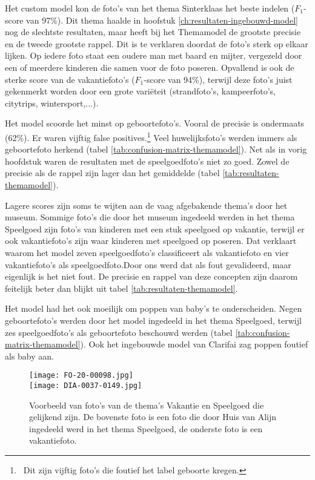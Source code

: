 Het custom model kon de foto's van het thema Sinterklaas het beste indelen ($F_1$-score van 97\%). Dit thema haalde in hoofstuk \ref{ch:resultaten-ingebouwd-model} nog de slechtste resultaten, maar heeft bij het Themamodel de grootste precisie en de tweede grootste rappel. Dit is te verklaren doordat de foto’s sterk op elkaar lijken. Op iedere foto staat een oudere man met baard en mijter, vergezeld door een of meerdere kinderen die samen voor de foto poseren. Opvallend is ook de sterke score van de vakantiefoto’s ($F_1$-score van 94\%), terwijl deze foto’s juist gekenmerkt worden door een grote variëteit (strandfoto’s, kampeerfoto’s, citytrips, wintersport,...).

Het model scoorde het minst op geboortefoto’s. Vooral de precisie is ondermaats (62\%). Er waren vijftig false positives.\footnote{~Dit zijn vijftig foto's die foutief het label geboorte kregen.} Veel huwelijksfoto’s werden immers als geboortefoto herkend (tabel \ref{tab:confusion-matrix-themamodel}). Net als in vorig hoofdstuk waren de resultaten met de speelgoedfoto’s niet zo goed. Zowel de precisie als de rappel zijn lager dan het gemiddelde (tabel \ref{tab:resultaten-themamodel}).

Lagere scores zijn soms te wijten aan de vaag afgebakende thema’s door het museum. Sommige foto’s die door het museum ingedeeld werden in het thema Speelgoed zijn foto’s van kinderen met een stuk speelgoed op vakantie, terwijl er ook vakantiefoto’s zijn waar kinderen met speelgoed op poseren. Dat verklaart waarom het model zeven speelgoedfoto’s classificeert als vakantiefoto en vier vakantiefoto’s als speelgoedfoto.Door ons werd dat als fout gevalideerd, maar eigenlijk is het niet fout. De precisie en rappel van deze concepten zijn daarom feitelijk beter dan blijkt uit tabel \ref{tab:resultaten-themamodel}.

Het model had het ook moeilijk om poppen van baby’s te onderscheiden. Negen geboortefoto’s werden door het model ingedeeld in het thema Speelgoed, terwijl zes speelgoedfoto’s als geboortefoto beschouwd werden (tabel \ref{tab:confusion-matrix-themamodel}). Ook het ingebouwde model van Clarifai zag poppen foutief als baby aan.

\begin{figure}
	\centering
	\texttt{[image: FO-20-00098.jpg]}\hfill
	\\[\smallskipamount]
	\texttt{[image: DIA-0037-0149.jpg]}\hfill
	\caption[Voorbeeld van foto's van de thema's Vakantie en Speelgoed die gelijkend zijn]{Voorbeeld van foto's van de thema's Vakantie en Speelgoed die gelijkend zijn. De bovenste foto is een foto die door Huis van Alijn ingedeeld werd in het thema Speelgoed, de onderste foto is een vakantiefoto.}
\end{figure}

